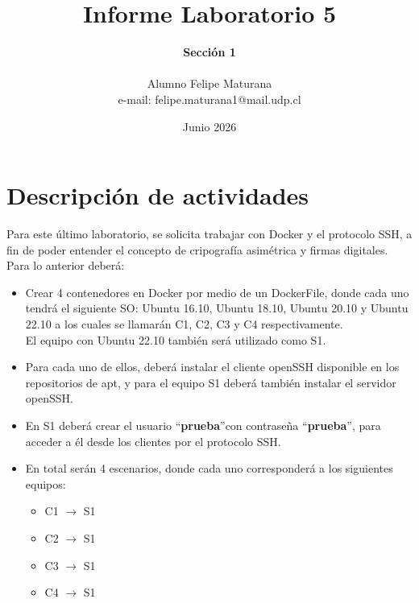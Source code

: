 \documentclass[letter,12pt]{article}
\begin{document}
%
   \title{\Huge{Informe Laboratorio 5}}

   \author{\textbf{Sección 1} \\  \\Alumno Felipe Maturana \\ e-mail: felipe.maturana1@mail.udp.cl}
          
   \date{Junio 2026}

   \maketitle

   \newpage
   
   \tableofcontents
 
  \newpage
  

\section*{Descripción de actividades}
Para este último laboratorio, se solicita trabajar con Docker y el protocolo SSH, a fin de poder entender el concepto de cripografía asimétrica y firmas digitales.\\

Para lo anterior deberá:

\begin{itemize}
    \item Crear 4 contenedores en Docker por medio de un DockerFile, donde cada uno tendrá el siguiente SO:
        Ubuntu 16.10, Ubuntu 18.10, Ubuntu 20.10 y Ubuntu 22.10 a los cuales se llamarán C1, C2, C3 y C4 respectivamente.\\
        El equipo con Ubuntu 22.10 también será utilizado como S1.
        
    \item  Para cada uno de ellos, deberá instalar el cliente openSSH disponible en los repositorios de apt, y para el equipo S1 deberá también instalar el servidor openSSH.

    \item En S1 deberá crear el usuario \textquotedblleft\textbf{prueba}\textquotedblright con contraseña \textquotedblleft\textbf{prueba}\textquotedblright, para acceder a él desde los clientes por el protocolo SSH.
    
    \item En total serán 4 escenarios, donde cada uno corresponderá a los siguientes equipos:
    \begin{itemize}
        \item C1 $\rightarrow$ S1
        \item C2 $\rightarrow$ S1
        \item C3 $\rightarrow$ S1
        \item C4 $\rightarrow$ S1
    \end{itemize}
\end{itemize}
\end{document}
